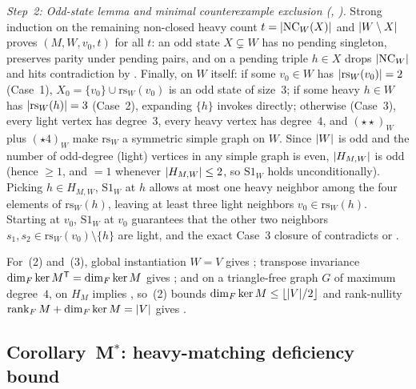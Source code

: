\begin{outline}
\emph{Step~2: Odd-state lemma and minimal counterexample exclusion (, ).}
Strong induction on the remaining non-closed heavy count $t = \lvert \mathrm{NC}_W(X) \rvert$ and $\lvert W \setminus X \rvert$ proves
$(M, W, v_0, t)$ for all $t$: an odd state $X \subsetneq W$ has no pending singleton, preserves
parity under pending pairs, and on a pending triple $h \in X$ drops $\lvert \mathrm{NC}_W \rvert$ and hits contradiction by
. Finally, on $W$ itself: if some $v_0 \in W$ has $\lvert \mathrm{rs}_W(v_0) \rvert = 2$ (Case~1), $X_0 = \{v_0\}
\cup \mathrm{rs}_W(v_0)$ is an odd state of size~$3$; if some heavy $h \in W$ has $\lvert \mathrm{rs}_W(h) \rvert = 3$ (Case~2),
expanding $\{h\}$ invokes  directly; otherwise (Case~3), every light vertex has degree~$3$, every heavy
vertex has degree~$4$, and $(\star\star)_W$ plus $(\star 4)_W$ make $\mathrm{rs}_W$ a symmetric simple graph on $W$. Since
$\lvert W \rvert$ is odd and the number of odd-degree (light) vertices in any simple graph is even, $\lvert H_{M,W} \rvert$ is odd
(hence $\ge 1$, and $= 1$ whenever $\lvert H_{M,W} \rvert \le 2$, so $\mathrm{S1}_W$ holds unconditionally). Picking $h \in
H_{M,W}$, $\mathrm{S1}_W$ at $h$ allows at most one heavy neighbor among the four elements of $\mathrm{rs}_W(h)$, leaving
at least three light neighbors $v_0 \in \mathrm{rs}_W(h)$. Starting at $v_0$, $\mathrm{S1}_W$ at $v_0$ guarantees that the
other two neighbors $s_1, s_2 \in \mathrm{rs}_W(v_0) \setminus \{h\}$ are light, and the exact Case~3 closure of
\cite{EighthPaper2026} contradicts  or .

For~(2) and~(3), global instantiation $W = V$ gives ; transpose invariance $\dim_F \ker M^{\mathsf{T}} =
\dim_F \ker M$ gives ; and on a triangle-free graph $G$ of maximum degree~$4$,
 on $H_M$ implies , so~(2) bounds $\dim_F \ker M \le \lfloor \lvert V \rvert/2 \rfloor$
and rank-nullity $\operatorname{rank}_F M + \dim_F \ker M = \lvert V \rvert$ gives .
\end{outline}

\subsection{Corollary~M\texorpdfstring{$^*$}{*}: heavy-matching deficiency bound}\label{sec:crux-matching}

